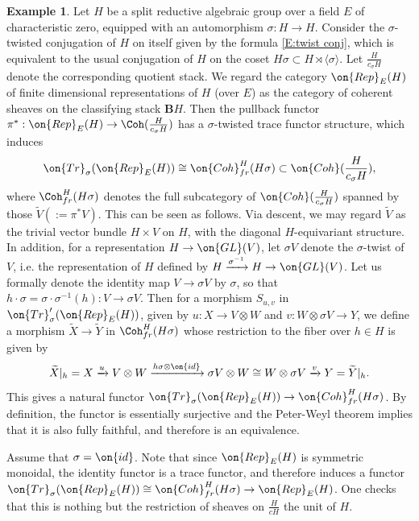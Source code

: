 \documentclass[11pt]{amsart}
\theoremstyle{definition}
\theoremstyle{definition}
\newtheorem{ex}[thm]{Example}
\theoremstyle{definition}
\numberwithin{equation}{subsection}
\newcommand{\id}{{\on{id}}}
\newcommand{\Tr}{{\on{Tr}}}
\newcommand{\GL}{{\on{GL}}}
\begin{document}
\begin{ex}
\label{E: trace of rep}
Let $H$ be a split reductive algebraic group over a field $E$ of characteristic zero, equipped with an automorphism $\sigma: H\to H$. Consider the $\sigma$-twisted conjugation of $H$ on itself given by the formula \eqref{E:twist conj},
which is equivalent to the usual conjugation of $H$ on the coset $H\sigma\subset H\rtimes\langle\sigma\rangle$.
Let $\frac{H}{c_\sigma H}$ denote the corresponding quotient stack. 
We regard the category $\on{Rep}_E(H)$ of finite dimensional representations of $H$ (over $E$) as the category of coherent sheaves on the classifying stack $\mathbf BH$. 
Then the pullback functor $\pi^*: \on{Rep}_E(H)\to \Coh(\frac{H}{c_\sigma H})$ has a $\sigma$-twisted trace functor structure, 
which induces
\[\Tr_\sigma(\on{Rep}_E(H))\cong \on{Coh}_{fr}^H(H\sigma)\subset \on{Coh}(\frac{H}{c_\sigma H}),\]
where $\Coh_{fr}^H(H\sigma)$ denotes the full subcategory of $\on{Coh}(\frac{H}{c_\sigma H})$ spanned by those $\widetilde V(:=\pi^*V)$. This can be seen as follows. 
Via descent, we may regard $\widetilde V$ as the trivial vector bundle $H\times V$ on $H$, with the diagonal $H$-equivariant structure. In addition,
for a representation $H\to \GL(V)$, let $\sigma V$ denote the $\sigma$-twist of $V$, i.e. the representation of $H$ defined by $H\xrightarrow{\sigma^{-1}}H\to\GL(V)$. Let us formally denote the identity map $V\to \sigma V$ by $\sigma$, so that $h\cdot \sigma=\sigma\cdot \sigma^{-1}(h):V\to\sigma V$.
Then for a morphism $S_{u,v}$ in $\Tr'_\sigma(\on{Rep}_E(H))$, given by $u:X\to V\otimes W$ and $v:W\otimes \sigma V\to Y$, we define a morphism $\widetilde{X}\to\widetilde{Y}$ in $\Coh_{fr}^H(H\sigma)$ whose restriction to the fiber over $h\in H$ is given by
\[
\widetilde{X}|_h=X\xrightarrow{u} V\otimes W\xrightarrow{h\sigma\otimes\id}\sigma V\otimes W\cong W\otimes \sigma V\xrightarrow{v} Y=\widetilde{Y}|_h.
\]
This gives a natural functor $\Tr_\sigma(\on{Rep}_E(H))\to \on{Coh}_{fr}^H(H\sigma)$. By definition, the functor is essentially surjective and the Peter-Weyl theorem implies that it is also fully faithful, and therefore is an equivalence.

Assume that $\sigma=\id$. Note that since $\on{Rep}_E(H)$ is symmetric monoidal, the identity functor is a trace functor, and therefore induces a functor $\Tr_\sigma(\on{Rep}_E(H))\cong \on{Coh}_{fr}^H(H\sigma)\to \on{Rep}_E(H)$. One checks that this is nothing but the restriction of sheaves on $\frac{H}{cH}$ the unit of $H$.
\end{ex}
\end{document}
